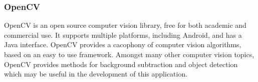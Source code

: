 \subsubsection{OpenCV}

OpenCV\cite{opencv} is an open source computer vision library, free for both academic and commercial use. It supports multiple platforms, including Android, and has a Java interface. OpenCV provides a cacophony of computer vision algorithms, based on an easy to use framework. Amongst many other computer vision topics, OpenCV provides methods for background subtraction and object detection which may be useful in the development of this application.